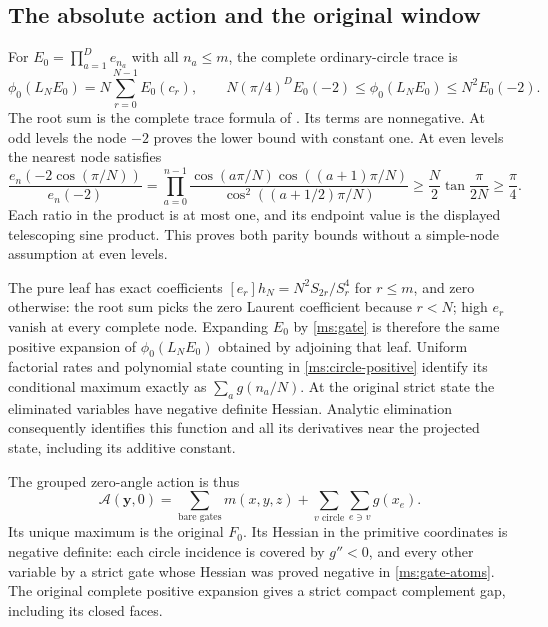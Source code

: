 \subsection{The absolute action and the original window}
For $E_0=\prod_{a=1}^D e_{n_a}$ with all $n_a\le m$, the complete
ordinary-circle trace is
\begin{equation}\label{ms:circle-positive}
 \phi_0(L_NE_0)=N\sum_{r=0}^{N-1}E_0(c_r),\qquad
 N(\pi/4)^D E_0(-2)\le\phi_0(L_NE_0)\le N^2E_0(-2).
\end{equation}
The root sum is the complete trace formula of
\cite[Section 6]{Meridian}. Its terms are nonnegative. At odd
levels the node $-2$ proves the lower bound with constant one.
At even levels the nearest node satisfies
\[
 \frac{e_n(-2\cos(\pi/N))}{e_n(-2)}
 =\prod_{a=0}^{n-1}
 \frac{\cos(a\pi/N)\cos((a+1)\pi/N)}
      {\cos^2((a+1/2)\pi/N)}
 \ge\frac N2\tan\frac\pi{2N}\ge\frac\pi4.
\]
Each ratio in the product is at most one, and its endpoint value
is the displayed telescoping sine product. This proves both parity
bounds without a simple-node assumption at even levels.

The pure leaf has exact coefficients
$[e_r]h_N=N^2S_{2r}/S_r^4$ for $r\le m$, and zero otherwise:
the root sum picks the zero Laurent coefficient because $r<N$;
high $e_r$ vanish at every complete node. Expanding $E_0$ by
\eqref{ms:gate} is therefore the same positive expansion of
$\phi_0(L_NE_0)$ obtained by adjoining that leaf. Uniform
factorial rates and polynomial state counting in
\eqref{ms:circle-positive} identify its conditional maximum
exactly as $\sum_a g(n_a/N)$. At the original strict state the
eliminated variables have negative definite Hessian. Analytic
elimination consequently identifies this function and all its
derivatives near the projected state, including its additive
constant.

The grouped zero-angle action is thus
\begin{equation}\label{ms:grouped-action}
 \mathcal A(\mathbf y,0)=\sum_{\text{bare gates}}m(x,y,z)
                  +\sum_{v\text{ circle}}\sum_{e\ni v}g(x_e).
\end{equation}
Its unique maximum is the original $F_0$. Its Hessian in the
primitive coordinates is negative definite: each circle incidence
is covered by $g''<0$, and every other variable by a strict gate
whose Hessian was proved negative in \eqref{ms:gate-atoms}.
The original complete positive expansion gives a strict compact
complement gap, including its closed faces.


